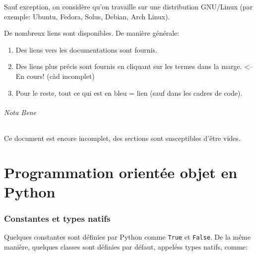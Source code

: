 \documentclass[a4paper, 10pt]{article}
\begin{document}
Sauf exception, on considère qu'on travaille sur une distribution GNU/Linux (par exemple: Ubuntu, Fedora, Solus, Debian, Arch Linux).\bigskip

De nombreux liens sont disponibles. De manière générale:
\begin{enumerate}
    \item Des liens vers les documentations sont fournis.
    \item Des liens plus précis sont fournis en cliquant sur les termes dans la marge. <-- En cours! (càd incomplet)
    \item Pour le reste, tout ce qui est en bleu = lien (sauf dans les cadres de code).
\end{enumerate}

\paragraph{Nota Bene} Ce document est encore incomplet, des sections sont susceptibles d'être vides.

\newpage
\part{Programmation orientée objet en Python}

\section{Constantes et types natifs}
 Quelques constantes sont définies par Python comme \texttt{True} et \texttt{False}. De la même manière, quelques classes sont définies par défaut, appeléss types natifs, comme:
\end{document}

